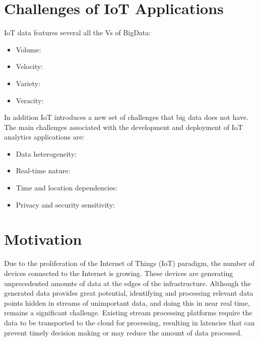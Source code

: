 \section{Challenges of IoT Applications}
IoT data features several all the Vs of BigData:
\begin{itemize}
    \item Volume: 
    \item Velocity:
    \item Variety: 
    \item Veracity: 
\end{itemize}

In addition IoT introduces a new set of challenges that big data does not have. The main challenges associated with the development and deployment of IoT analytics applications are:

\begin{itemize}
    \item Data heterogeneity:
    \item Real-time nature:
    \item Time and location dependencies:
    \item Privacy and security sensitivity:
\end{itemize}



\section{Motivation}

Due to the proliferation of the Internet of Things (IoT) paradigm, the number of devices connected to the Internet is growing. These devices are generating unprecedented amounts of data at the edges of the infrastructure. Although the generated data provides great potential, identifying and processing relevant data points hidden in streams of unimportant data, and doing this in near real time, remains a significant challenge. Existing stream processing platforms require the data to be transported to the cloud for processing, resulting in latencies that can prevent timely decision making or may reduce the amount of data processed.



